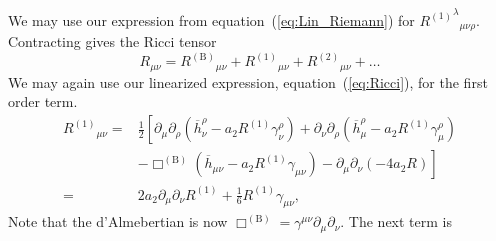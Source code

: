 \documentclass[a4paper, 11pt, titlepage, twoside]{report}
\newcommand{\eqnref}[1]{equation~(\ref{eq:#1})}
\newcommand{\recip}[1]{\ensuremath{\frac{1}{#1}}}
\begin{document}
We may use our expression from \eqnref{Lin_Riemann} for ${{R^{(1)}}^\lambda}_{\mu\nu\rho}$. Contracting gives the Ricci tensor
\begin{equation}
{R}_{\mu\nu} = {R^{(\mathrm{B})}}_{\mu\nu} + {R^{(1)}}_{\mu\nu} + {R^{(2)}}_{\mu\nu} + \ldots
\end{equation}
We may again use our linearized expression, \eqnref{Ricci}, for the first order term.
\begin{align}
{R^{(1)}}_{\mu\nu} = {} & \frac{1}{2}\left[\partial_\mu\partial_\rho \left(\overline{h}^\rho_\nu - a_2 R^{(1)}\gamma^\rho_\nu\right) + \partial_\nu\partial_\rho \left(\overline{h}^\rho_\mu - a_2 R^{(1)}\gamma^\rho_\mu\right) \right. \nonumber \\ 
 & - \left. \Box^{(\mathrm{B})} \left(\overline{h}_{\mu\nu} - a_2 R^{(1)}\gamma_{\mu\nu}\right) - \partial_\mu\partial_\nu \left(-4a_2 R\right)\right] \\ \nonumber
 = {} & 2 a_2\partial_\mu\partial_\nu R^{(1)} + \recip{6} R^{(1)}\gamma_{\mu\nu},
\end{align}
Note that the d'Almebertian is now $\Box^{(\mathrm{B})} = \gamma^{\mu\nu}\partial_\mu\partial_\nu$. The next term is
\end{document}
